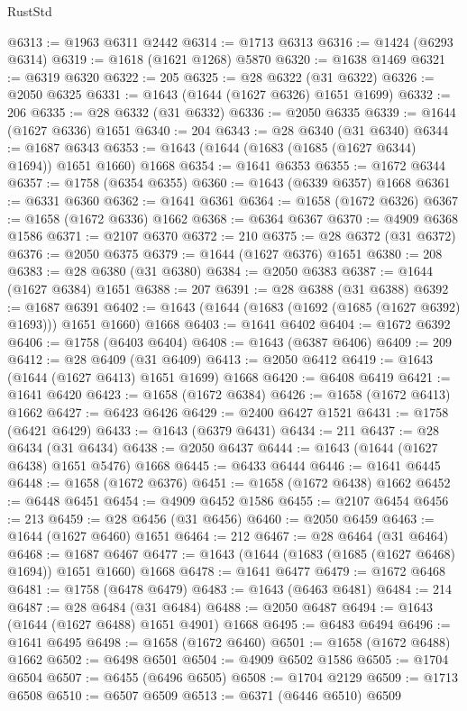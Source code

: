 \begin{lexlean}{RustStd}
\begin{coremodule}
@6313 := @1963 @6311 @2442
@6314 := @1713 @6313
@6316 := @1424 (@6293 @6314)
@6319 := @1618 (@1621 @1268) @5870
@6320 := @1638 @1469
@6321 := @6319 @6320
@6322 := 205
@6325 := @28 @6322 (@31 @6322)
@6326 := @2050 @6325
@6331 := @1643 (@1644 (@1627 @6326) @1651 @1699)
@6332 := 206
@6335 := @28 @6332 (@31 @6332)
@6336 := @2050 @6335
@6339 := @1644 (@1627 @6336) @1651
@6340 := 204
@6343 := @28 @6340 (@31 @6340)
@6344 := @1687 @6343
@6353 := @1643 (@1644 (@1683 (@1685 (@1627 @6344) @1694)) @1651 @1660) @1668
@6354 := @1641 @6353
@6355 := @1672 @6344
@6357 := @1758 (@6354 @6355)
@6360 := @1643 (@6339 @6357) @1668
@6361 := @6331 @6360
@6362 := @1641 @6361
@6364 := @1658 (@1672 @6326)
@6367 := @1658 (@1672 @6336) @1662
@6368 := @6364 @6367
@6370 := @4909 @6368 @1586
@6371 := @2107 @6370
@6372 := 210
@6375 := @28 @6372 (@31 @6372)
@6376 := @2050 @6375
@6379 := @1644 (@1627 @6376) @1651
@6380 := 208
@6383 := @28 @6380 (@31 @6380)
@6384 := @2050 @6383
@6387 := @1644 (@1627 @6384) @1651
@6388 := 207
@6391 := @28 @6388 (@31 @6388)
@6392 := @1687 @6391
@6402 := @1643 (@1644 (@1683 (@1692 (@1685 (@1627 @6392) @1693))) @1651 @1660) @1668
@6403 := @1641 @6402
@6404 := @1672 @6392
@6406 := @1758 (@6403 @6404)
@6408 := @1643 (@6387 @6406)
@6409 := 209
@6412 := @28 @6409 (@31 @6409)
@6413 := @2050 @6412
@6419 := @1643 (@1644 (@1627 @6413) @1651 @1699) @1668
@6420 := @6408 @6419
@6421 := @1641 @6420
@6423 := @1658 (@1672 @6384)
@6426 := @1658 (@1672 @6413) @1662
@6427 := @6423 @6426
@6429 := @2400 @6427 @1521
@6431 := @1758 (@6421 @6429)
@6433 := @1643 (@6379 @6431)
@6434 := 211
@6437 := @28 @6434 (@31 @6434)
@6438 := @2050 @6437
@6444 := @1643 (@1644 (@1627 @6438) @1651 @5476) @1668
@6445 := @6433 @6444
@6446 := @1641 @6445
@6448 := @1658 (@1672 @6376)
@6451 := @1658 (@1672 @6438) @1662
@6452 := @6448 @6451
@6454 := @4909 @6452 @1586
@6455 := @2107 @6454
@6456 := 213
@6459 := @28 @6456 (@31 @6456)
@6460 := @2050 @6459
@6463 := @1644 (@1627 @6460) @1651
@6464 := 212
@6467 := @28 @6464 (@31 @6464)
@6468 := @1687 @6467
@6477 := @1643 (@1644 (@1683 (@1685 (@1627 @6468) @1694)) @1651 @1660) @1668
@6478 := @1641 @6477
@6479 := @1672 @6468
@6481 := @1758 (@6478 @6479)
@6483 := @1643 (@6463 @6481)
@6484 := 214
@6487 := @28 @6484 (@31 @6484)
@6488 := @2050 @6487
@6494 := @1643 (@1644 (@1627 @6488) @1651 @4901) @1668
@6495 := @6483 @6494
@6496 := @1641 @6495
@6498 := @1658 (@1672 @6460)
@6501 := @1658 (@1672 @6488) @1662
@6502 := @6498 @6501
@6504 := @4909 @6502 @1586
@6505 := @1704 @6504
@6507 := @6455 (@6496 @6505)
@6508 := @1704 @2129
@6509 := @1713 @6508
@6510 := @6507 @6509
@6513 := @6371 (@6446 @6510) @6509

\end{coremodule}
\end{lexlean}
